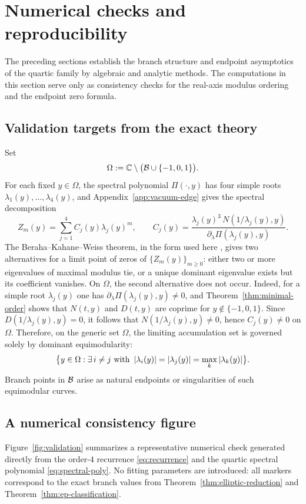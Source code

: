 \section{Numerical checks and reproducibility}\label{sec:verification}

The preceding sections establish the branch structure and endpoint asymptotics of the quartic family by algebraic and analytic methods.
The computations in this section serve only as consistency checks for the real-axis modulus ordering and the endpoint zero formula.

\subsection{Validation targets from the exact theory}

Set
\[
\Omega:=\mathbb{C}\setminus\bigl(\mathcal{B}\cup\{-1,0,1\}\bigr).
\]
For each fixed $y \in \Omega$, the spectral polynomial $\Pi(\cdot, y)$ has four simple roots $\lambda_1(y), \dots, \lambda_4(y)$, and Appendix~\ref{app:vacuum-edge} gives the spectral decomposition
\[
Z_m(y)=\sum_{j=1}^4 C_j(y)\lambda_j(y)^m,
\qquad
C_j(y)=\frac{\lambda_j(y)^3\,N(1/\lambda_j(y),y)}{\partial_\lambda\Pi(\lambda_j(y),y)}.
\]
The Beraha--Kahane--Weiss theorem, in the form used here \cite{BerahaKahaneWeiss1975,BerahaKahaneWeiss1978,Sokal2004}, gives two alternatives for a limit point of zeros of \(\{Z_m(y)\}_{m\ge0}\): either two or more eigenvalues of maximal modulus tie, or a unique dominant eigenvalue exists but its coefficient vanishes.
On \(\Omega\), the second alternative does not occur.
Indeed, for a simple root \(\lambda_j(y)\) one has \(\partial_\lambda\Pi(\lambda_j(y),y)\neq 0\), and Theorem~\ref{thm:minimal-order} shows that \(N(t,y)\) and \(D(t,y)\) are coprime for \(y\notin\{-1,0,1\}\).
Since \(D(1/\lambda_j(y),y)=0\), it follows that \(N(1/\lambda_j(y),y)\neq 0\), hence \(C_j(y)\neq 0\) on \(\Omega\).
Therefore, on the generic set \(\Omega\), the limiting accumulation set is governed solely by dominant equimodularity:
\[
\bigl\{y \in \Omega : \exists\, i \neq j \text{ with }
\left\lvert \lambda_i(y)\right\rvert = \left\lvert \lambda_j(y)\right\rvert = \max_k \left\lvert \lambda_k(y)\right\rvert\bigr\}.
\]
Branch points in $\mathcal{B}$ arise as natural endpoints or singularities of such equimodular curves.

\subsection{A numerical consistency figure}

Figure~\ref{fig:validation} summarizes a representative numerical check generated directly from the order-$4$ recurrence \eqref{eq:recurrence} and the quartic spectral polynomial \eqref{eq:spectral-poly}.
No fitting parameters are introduced: all markers correspond to the exact branch values from Theorem~\ref{thm:elliptic-reduction} and Theorem~\ref{thm:ep-classification}.

